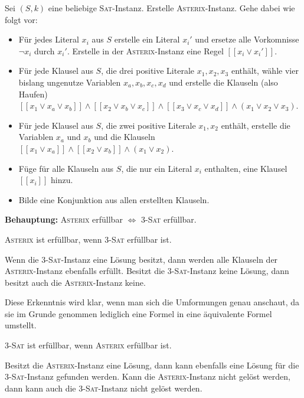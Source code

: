 \documentclass{article}
\begin{document}
Sei $(S, k)$ eine beliebige \textsc{Sat}-Instanz. 
Erstelle \textsc{Asterix}-Instanz. Gehe dabei wie folgt vor:
\begin{itemize}
  \item Für jedes Literal $x_i$ aus $S$ erstelle ein Literal $x_i'$ und ersetze alle Vorkomnisse $\neg x_i$ durch $x_i'$. Erstelle in der \textsc{Asterix}-Instanz eine Regel $[[x_i \vee x_i']]$.
	\item Für jede Klausel aus $S$, die drei positive Literale $x_1, x_2, x_3$ enthält, wähle vier bislang ungenutze Variablen $x_a, x_b, x_c, x_d$ und erstelle die Klauseln (also Haufen) $[[x_1 \vee x_a \vee x_b]] \wedge [[x_2 \vee x_b \vee x_c]] \wedge [[x_3 \vee x_c \vee x_d]] \wedge (x_1 \vee x_2 \vee x_3)$.
	\item Für jede Klausel aus $S$, die zwei positive Literale $x_1, x_2$ enthält, erstelle die Variablen $x_a$ und $x_b$ und die Klauseln $[[x_1 \vee x_a]] \wedge [[x_2 \vee x_b]] \wedge (x_1 \vee x_2)$.
	\item Füge für alle Klauseln aus $S$, die nur ein Literal $x_i$ enthalten, eine Klausel $[[x_i]]$ hinzu.
	\item Bilde eine Konjunktion aus allen erstellten Klauseln.
\end{itemize}

\smallskip

\textbf{Behauptung:} \textsc{Asterix} erfüllbar $\Leftrightarrow$ \textsc{3-Sat} erfüllbar.

\smallskip

\textsc{Asterix} ist erfüllbar, wenn \textsc{3-Sat} erfüllbar ist.

Wenn die \textsc{3-Sat}-Instanz eine Lösung besitzt, dann werden alle Klauseln der \textsc{Asterix}-Instanz ebenfalls erfüllt.
Besitzt die \textsc{3-Sat}-Instanz keine Lösung, dann besitzt auch die \textsc{Asterix}-Instanz keine.

Diese Erkenntnis wird klar, wenn man sich die Umformungen genau anschaut, da sie im Grunde genommen lediglich eine Formel in eine äquivalente Formel umstellt.

\smallskip

\textsc{3-Sat} ist erfüllbar, wenn \textsc{Asterix} erfüllbar ist.

Besitzt die \textsc{Asterix}-Instanz eine Lösung, dann kann ebenfalls eine Lösung für die \textsc{3-Sat}-Instanz gefunden werden.
Kann die \textsc{Asterix}-Instanz nicht gelöst werden, dann kann auch die \textsc{3-Sat}-Instanz nicht gelöst werden.
\end{document}
